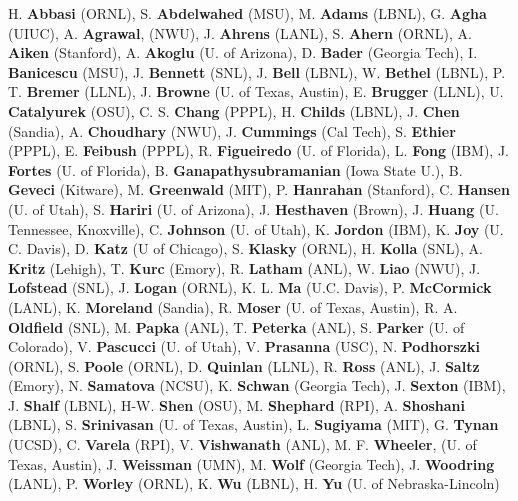H. \textbf{Abbasi} (ORNL),
S. \textbf{Abdelwahed} (MSU),
M. \textbf{Adams} (LBNL),
G. \textbf{Agha} (UIUC),
A. \textbf{Agrawal}, (NWU),
J. \textbf{Ahrens} (LANL),
S. \textbf{Ahern} (ORNL),
A. \textbf{Aiken} (Stanford),
A. \textbf{Akoglu} (U. of Arizona),
D. \textbf{Bader} (Georgia Tech),
I. \textbf{Banicescu} (MSU),
J. \textbf{Bennett} (SNL),
J. \textbf{Bell} (LBNL),
W. \textbf{Bethel} (LBNL), 
P. T. \textbf{Bremer} (LLNL),
J. \textbf{Browne} (U. of Texas, Austin),
E. \textbf{Brugger} (LLNL), 
U. \textbf{Catalyurek} (OSU),
C. S. \textbf{Chang} (PPPL), 
H. \textbf{Childs} (LBNL),
J. \textbf{Chen} (Sandia),
A. \textbf{Choudhary} (NWU),
J. \textbf{Cummings} (Cal Tech),
S. \textbf{Ethier} (PPPL), 
E. \textbf{Feibush} (PPPL),
R. \textbf{Figueiredo} (U. of Florida), 
L. \textbf{Fong} (IBM),
J. \textbf{Fortes} (U. of Florida), 
B. \textbf{Ganapathysubramanian} (Iowa State U.),
B. \textbf{Geveci} (Kitware),
M. \textbf{Greenwald} (MIT),
P. \textbf{Hanrahan} (Stanford),
C. \textbf{Hansen} (U. of Utah),
S. \textbf{Hariri} (U. of Arizona),
J. \textbf{Hesthaven} (Brown),
J. \textbf{Huang} (U. Tennessee, Knoxville),
C. \textbf{Johnson} (U. of Utah),
K. \textbf{Jordon} (IBM), 
K. \textbf{Joy} (U. C. Davis),
D. \textbf{Katz} (U of Chicago),
S. \textbf{Klasky} (ORNL), 
H. \textbf{Kolla} (SNL),
A. \textbf{Kritz} (Lehigh),
T. \textbf{Kurc} (Emory),
R. \textbf{Latham} (ANL),
W. \textbf{Liao} (NWU),
J. \textbf{Lofstead} (SNL),
J. \textbf{Logan} (ORNL),
K. L. \textbf{Ma} (U.C. Davis),
P. \textbf{McCormick} (LANL),
K. \textbf{Moreland} (Sandia),
R. \textbf{Moser} (U. of Texas, Austin),
R. A. \textbf{Oldfield} (SNL),
M. \textbf{Papka} (ANL),
T. \textbf{Peterka} (ANL),
S. \textbf{Parker} (U. of Colorado),
V. \textbf{Pascucci} (U. of  Utah),
V. \textbf{Prasanna} (USC),
N. \textbf{Podhorszki} (ORNL),
S. \textbf{Poole} (ORNL),
D. \textbf{Quinlan} (LLNL),
R. \textbf{Ross} (ANL), 
J. \textbf{Saltz} (Emory),
N. \textbf{Samatova} (NCSU),
K. \textbf{Schwan} (Georgia Tech),
J. \textbf{Sexton} (IBM),
J. \textbf{Shalf} (LBNL),
H-W. \textbf{Shen} (OSU),
M. \textbf{Shephard} (RPI),
A. \textbf{Shoshani} (LBNL),
S. \textbf{Srinivasan} (U. of Texas, Austin),
L. \textbf{Sugiyama} (MIT), 
G. \textbf{Tynan} (UCSD),
C. \textbf{Varela} (RPI),
V. \textbf{Vishwanath} (ANL),
M. F. \textbf{Wheeler}, (U. of Texas, Austin),
J. \textbf{Weissman} (UMN),
M. \textbf{Wolf} (Georgia Tech),
J. \textbf{Woodring} (LANL),
P. \textbf{Worley} (ORNL),
K. \textbf{Wu} (LBNL),
H. \textbf{Yu} (U. of Nebraska-Lincoln)

